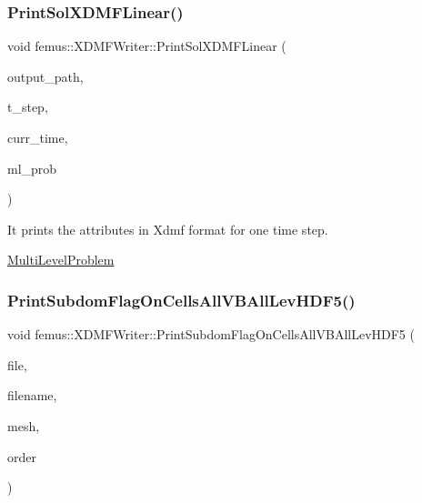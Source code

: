 \mbox{\label{classfemus_1_1_x_d_m_f_writer_a769cbc2ebb69a79fd2a1dee182f90fba}} 
\subsubsection{\texorpdfstring{Print\+Sol\+X\+D\+M\+F\+Linear()}{PrintSolXDMFLinear()}}
{\footnotesize\ttfamily void femus\+::\+X\+D\+M\+F\+Writer\+::\+Print\+Sol\+X\+D\+M\+F\+Linear (\begin{DoxyParamCaption}\item[{const std\+::string}]{output\+\_\+path,  }\item[{const \mbox{\hyperlink{_typedefs_8hpp_a91ad9478d81a7aaf2593e8d9c3d06a14}{uint}}}]{t\+\_\+step,  }\item[{const double}]{curr\+\_\+time,  }\item[{const \mbox{\hyperlink{classfemus_1_1_multi_level_problem}{Multi\+Level\+Problem}} \&}]{ml\+\_\+prob }\end{DoxyParamCaption})\hspace{0.3cm}{\ttfamily [static]}}



It prints the attributes in Xdmf format for one time step. 

\mbox{\hyperlink{classfemus_1_1_multi_level_problem}{Multi\+Level\+Problem}} \mbox{\label{classfemus_1_1_x_d_m_f_writer_aade7715d403c09f244952e5dcde3b692}} 
\subsubsection{\texorpdfstring{Print\+Subdom\+Flag\+On\+Cells\+All\+V\+B\+All\+Lev\+H\+D\+F5()}{PrintSubdomFlagOnCellsAllVBAllLevHDF5()}}
{\footnotesize\ttfamily void femus\+::\+X\+D\+M\+F\+Writer\+::\+Print\+Subdom\+Flag\+On\+Cells\+All\+V\+B\+All\+Lev\+H\+D\+F5 (\begin{DoxyParamCaption}\item[{hid\+\_\+t \&}]{file,  }\item[{std\+::string}]{filename,  }\item[{const \mbox{\hyperlink{classfemus_1_1_multi_level_mesh_two}{Multi\+Level\+Mesh\+Two}} \&}]{mesh,  }\item[{const \mbox{\hyperlink{_typedefs_8hpp_a91ad9478d81a7aaf2593e8d9c3d06a14}{uint}}}]{order }\end{DoxyParamCaption})\hspace{0.3cm}{\ttfamily [static]}}


